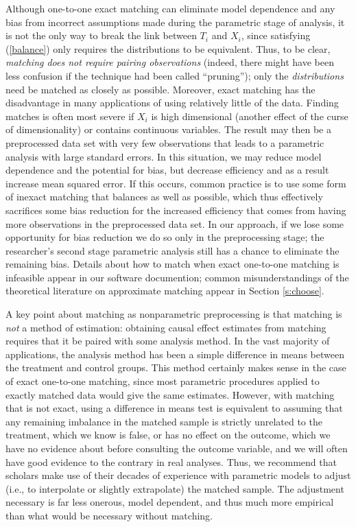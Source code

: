 \documentclass[11pt,titlepage]{article}
\begin{document}
Although one-to-one exact matching can eliminate model dependence and
any bias from incorrect assumptions made during the parametric stage
of analysis, it is not the only way to break the link between $T_i$
and $X_i$, since satisfying (\ref{balance}) only requires the
distributions to be equivalent.  Thus, to be clear, \emph{matching
  does not require pairing observations} (indeed, there might have
been less confusion if the technique had been called ``pruning'');
only the \emph{distributions} need be matched as closely as possible.
Moreover, exact matching has the disadvantage in many applications of
using relatively little of the data.  Finding matches is often most
severe if $X_i$ is high dimensional (another effect of the curse of
dimensionality) or contains continuous variables.  The result may then
be a preprocessed data set with very few observations that leads to a
parametric analysis with large standard errors.  In this situation, we
may reduce model dependence and the potential for bias, but decrease
efficiency and as a result increase mean squared error.  If this
occurs, common practice is to use some form of inexact matching that
balances as well as possible, which thus effectively sacrifices some
bias reduction for the increased efficiency that comes from having
more observations in the preprocessed data set.  In our approach, if
we lose some opportunity for bias reduction we do so only in the
preprocessing stage; the researcher's second stage parametric analysis
still has a chance to eliminate the remaining bias.  Details about how
to match when exact one-to-one matching is infeasible appear in our
software documention; common misunderstandings of the theoretical
literature on approximate matching appear in Section \ref{s:choose}.

A key point about matching as nonparametric preprocessing is that
matching is \emph{not} a method of estimation: obtaining causal effect
estimates from matching requires that it be paired with some analysis
method.  In the vast majority of applications, the analysis method has
been a simple difference in means between the treatment and control
groups.  This method certainly makes sense in the case of exact
one-to-one matching, since most parametric procedures applied to
exactly matched data would give the same estimates.  However, with
matching that is not exact, using a difference in means test is
equivalent to assuming that any remaining imbalance in the matched
sample is strictly unrelated to the treatment, which we know is false,
or has no effect on the outcome, which we have no evidence about
before consulting the outcome variable, and we will often have good
evidence to the contrary in real analyses.  Thus, we recommend that
scholars make use of their decades of experience with parametric
models to adjust (i.e., to interpolate or slightly extrapolate) the
matched sample.  The adjustment necessary is far less onerous, model
dependent, and thus much more empirical than what would be necessary
without matching.
\end{document}
